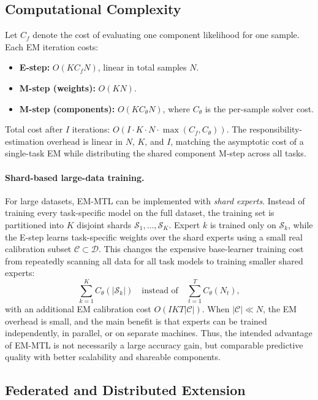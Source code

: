 \documentclass[preprint,12pt]{elsarticle}
\begin{document}
	\subsection{Computational Complexity}
	
	Let $C_f$ denote the cost of evaluating one component likelihood
	for one sample. Each EM iteration costs:
	\begin{itemize}
		\item \textbf{E-step:} $O(KC_f N)$, linear in total samples $N$.
		\item \textbf{M-step (weights):} $O(KN)$.
		\item \textbf{M-step (components):} $O(KC_\theta N)$, where
		$C_\theta$ is the per-sample solver cost.
	\end{itemize}
	Total cost after $I$ iterations: $O(I \cdot K \cdot N \cdot
	\max(C_f, C_\theta))$. The responsibility-estimation overhead is
	linear in $N$, $K$, and $I$, matching the asymptotic cost of a
	single-task EM while distributing the shared component M-step across
	all tasks.
	
	\paragraph{Shard-based large-data training.}
	For large datasets, EM-MTL can be implemented with \emph{shard
	experts}. Instead of training every task-specific model on the full
	dataset, the training set is partitioned into $K$ disjoint shards
	$\mathcal{S}_1,\dots,\mathcal{S}_K$. Expert $k$ is trained only on
	$\mathcal{S}_k$, while the E-step learns task-specific weights over the
	shard experts using a small real calibration subset
	$\mathcal{C}\subset\mathcal{D}$. This changes the expensive base-learner
	training cost from repeatedly scanning all data for all task models to
	training smaller shared experts:
	\[
	\sum_{k=1}^K C_\theta(|\mathcal{S}_k|)
	\quad \text{instead of} \quad
	\sum_{t=1}^T C_\theta(N_t),
	\]
	with an additional EM calibration cost
	$O(IKT|\mathcal{C}|)$. When $|\mathcal{C}|\ll N$, the EM overhead is
	small, and the main benefit is that experts can be trained independently,
	in parallel, or on separate machines. Thus, the intended advantage of
	EM-MTL is not necessarily a large accuracy gain, but comparable
	predictive quality with better scalability and shareable components.
	
	\subsection{Federated and Distributed Extension}
	\label{sec:federated}
	
\end{document}
